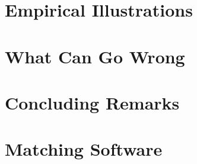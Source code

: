 \documentclass[11pt,titlepage]{article}
\begin{document}
\section{Empirical Illustrations}

\section{What Can Go Wrong}

\section{Concluding Remarks}

\appendix
\section{Matching Software}


 
\end{document}
